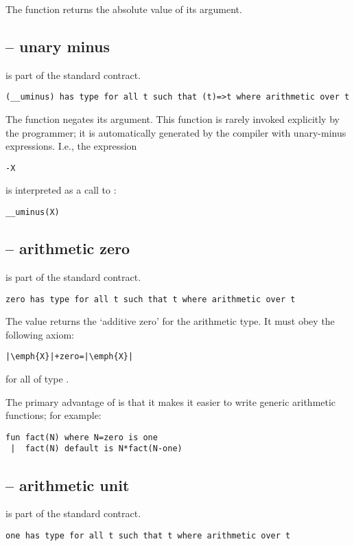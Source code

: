 The  function returns the absolute value of its argument.

\subsection{ -- unary minus}
\label{unaryMinus}
 is part of the standard  contract.
\begin{lstlisting}
(__uminus) has type for all t such that (t)=>t where arithmetic over t
\end{lstlisting}
The  function negates its argument. This function is rarely invoked explicitly by the programmer; it is automatically generated by the compiler with unary-minus expressions. I.e., the expression
\begin{lstlisting}
-X
\end{lstlisting}
is interpreted as a call to :
\begin{lstlisting}
__uminus(X)
\end{lstlisting}

\subsection{ -- arithmetic zero}
\label{zero}
 is part of the standard  contract.
\begin{lstlisting}
zero has type for all t such that t where arithmetic over t
\end{lstlisting}

The  value returns the `additive zero' for the arithmetic type. It must obey the following axiom:

\begin{lstlisting}[escapechar=|]
|\emph{X}|+zero=|\emph{X}|
\end{lstlisting}
for all  of type .

The primary advantage of  is that it makes it easier to write generic arithmetic functions; for example:

\begin{lstlisting}
fun fact(N) where N=zero is one
 |  fact(N) default is N*fact(N-one)
\end{lstlisting}


\subsection{ -- arithmetic unit}
\label{one}
 is part of the standard  contract.
\begin{lstlisting}
one has type for all t such that t where arithmetic over t
\end{lstlisting}


